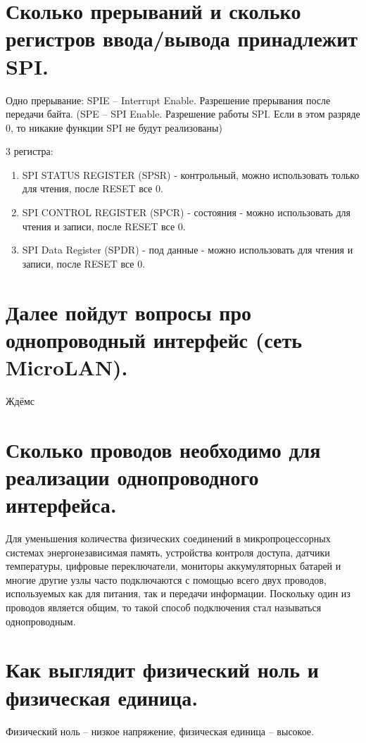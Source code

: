 \section{Сколько прерываний и сколько регистров ввода/вывода принадлежит SPI.}

Одно прерывание: SPIE – Interrupt Enable. Разрешение прерывания после передачи байта. 
(SPE – SPI Enable. Разрешение работы SPI. Если в этом разряде $0$, то никакие функции SPI 
не будут реализованы)

3 регистра: 
\begin{enumerate}
  \item SPI STATUS REGISTER (SPSR) - контрольный, можно использовать только для чтения,
        после RESET все $0$. 
  \item SPI CONTROL REGISTER (SPCR) - состояния - можно использовать для чтения и записи,
        после RESET все $0$.
  \item SPI Data Register (SPDR) - под данные - можно использовать для чтения и записи,
        после RESET все $0$. 
\end{enumerate}

\section{Далее пойдут вопросы про однопроводный интерфейс (сеть MicroLAN).}

Ждёмс

\section{Сколько проводов необходимо для реализации однопроводного интерфейса.}

Для уменьшения количества физических соединений в микропроцессорных системах энергонезависимая
память, устройства контроля доступа, датчики температуры, цифровые переключатели, мониторы
аккумуляторных батарей и многие другие узлы часто подключаются с помощью всего двух проводов,
используемых как для питания, так и передачи информации. Поскольку один из проводов является
общим, то такой способ подключения стал называться однопроводным.

\section{Как выглядит физический ноль и физическая единица.}

Физический ноль -- низкое напряжение, физическая единица -- высокое.

